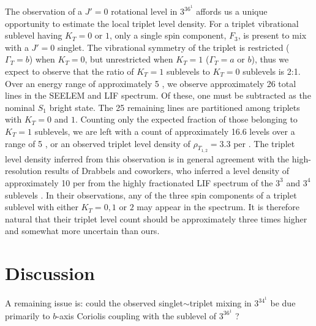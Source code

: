\documentclass[12pt]{mitthesis}
\begin{document}
The observation of a $J'=0$ rotational level in $3^36^1$ 
affords us a unique opportunity to estimate the local triplet level
density.  For a triplet vibrational sublevel having $K_T=0$ or $1$,
only a single spin component, $F_3$, is present to mix with a $J'=0$
singlet.  The vibrational symmetry of the triplet is restricted
($\Gamma_T=b$) when $K_T=0$, but unrestricted when $K_T=1$
($\Gamma_T=a$ or $b$), thus we expect to observe that the ratio of
$K_T=1$ sublevels to $K_T=0$ sublevels is 2:1.  Over an energy range
of approximately 5 \rcm, we observe approximately 26 total lines in
the SEELEM and LIF spectrum.  Of these, one must be subtracted as the
nominal $S_1$ bright state.  The 25 remaining lines are partitioned
among triplets with $K_T=0$ and $1$.  Counting only the expected
fraction of those belonging to $K_T=1$ sublevels, we are left with a
count of approximately 16.6 levels over a range of 5 \rcm, or an
observed triplet level density of $\rho_{T_{1,2}} = 3.3$ per \rcm.
The triplet level density inferred from this observation is in general
agreement with the high-resolution results of Drabbels and coworkers,
who inferred a level density of approximately 10 per \rcm from the
highly fractionated LIF spectrum of the $3^3$  and $3^4$ 
sublevels \cite{drabbels94}.  In their observations, any of the three
spin components of a triplet sublevel with either $K_T=0, 1$ or $2$
may appear in the spectrum.  It is therefore natural that their
triplet level count should be approximately three times higher and
somewhat more uncertain than ours.








\section{Discussion}

A remaining issue is: could the observed singlet$\sim$triplet mixing
in $3^34^1$  be due primarily to $b$-axis Coriolis coupling with
the  sublevel of $3^36^1$ ? 
\end{document}

